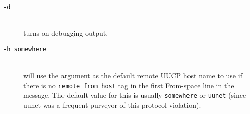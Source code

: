 \begin{description}
\item[ {\tt -d} ] \mbox{} \\

turns on debugging output.



\item[ {\tt -h somewhere} ] \mbox{} \\

will use the argument as the 
default remote UUCP host name to use if there is no {\tt remote from host}
tag in the first From-space line in  the message.
The  default value for this is usually {\tt somewhere} or
{\tt uunet} (since uunet was a frequent purveyor of this
protocol violation).

\end{description}

